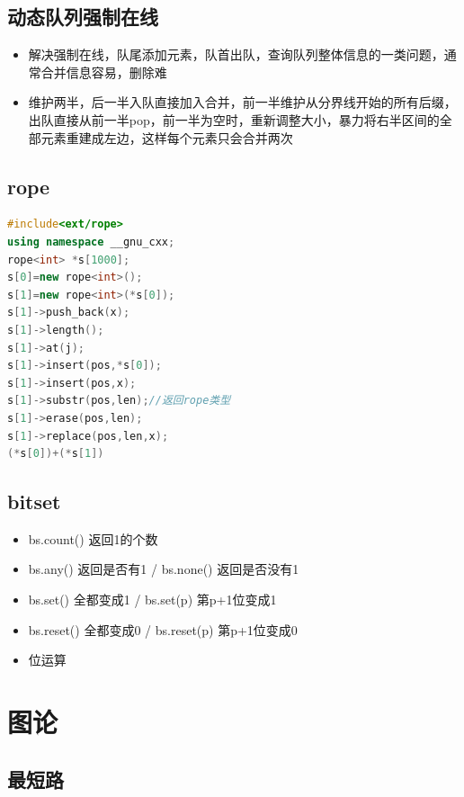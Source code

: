 \documentclass[UTF8,a4paper,titlepage]{ctexart}
\begin{document}
\subsection{动态队列强制在线}
\begin{itemize}
\item 解决强制在线，队尾添加元素，队首出队，查询队列整体信息的一类问题，通常合并信息容易，删除难
\item 维护两半，后一半入队直接加入合并，前一半维护从分界线开始的所有后缀，出队直接从前一半pop，前一半为空时，重新调整大小，暴力将右半区间的全部元素重建成左边，这样每个元素只会合并两次
\end{itemize}
\subsection{rope}
\begin{lstlisting}[language=C++]
#include<ext/rope>
using namespace __gnu_cxx;
rope<int> *s[1000];
s[0]=new rope<int>();
s[1]=new rope<int>(*s[0]);
s[1]->push_back(x);
s[1]->length();
s[1]->at(j);
s[1]->insert(pos,*s[0]);
s[1]->insert(pos,x);
s[1]->substr(pos,len);//返回rope类型
s[1]->erase(pos,len);
s[1]->replace(pos,len,x);
(*s[0])+(*s[1])
\end{lstlisting}
\subsection{bitset}
\begin{itemize}
\item bs.count() 返回1的个数
\item bs.any() 返回是否有1 / bs.none() 返回是否没有1
\item bs.set() 全都变成1 / bs.set(p) 第p+1位变成1
\item bs.reset() 全都变成0 / bs.reset(p) 第p+1位变成0
\item 位运算
\end{itemize}

\section{图论}
\subsection{最短路}
\end{document}
